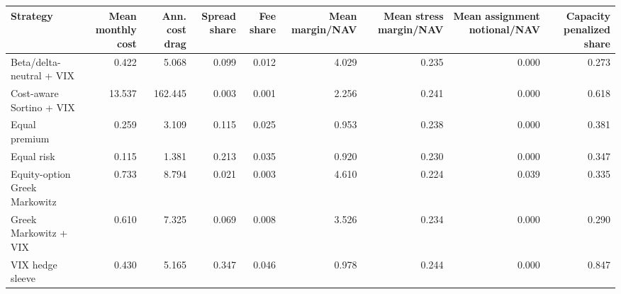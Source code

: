 \begin{tabular}{lrrrrrrrr}
\toprule
Strategy & Mean monthly cost & Ann. cost drag & Spread share & Fee share & Mean margin/NAV & Mean stress margin/NAV & Mean assignment notional/NAV & Capacity penalized share \\
\midrule
Beta/delta-neutral + VIX & 0.422 & 5.068 & 0.099 & 0.012 & 4.029 & 0.235 & 0.000 & 0.273 \\
Cost-aware Sortino + VIX & 13.537 & 162.445 & 0.003 & 0.001 & 2.256 & 0.241 & 0.000 & 0.618 \\
Equal premium & 0.259 & 3.109 & 0.115 & 0.025 & 0.953 & 0.238 & 0.000 & 0.381 \\
Equal risk & 0.115 & 1.381 & 0.213 & 0.035 & 0.920 & 0.230 & 0.000 & 0.347 \\
Equity-option Greek Markowitz & 0.733 & 8.794 & 0.021 & 0.003 & 4.610 & 0.224 & 0.039 & 0.335 \\
Greek Markowitz + VIX & 0.610 & 7.325 & 0.069 & 0.008 & 3.526 & 0.234 & 0.000 & 0.290 \\
VIX hedge sleeve & 0.430 & 5.165 & 0.347 & 0.046 & 0.978 & 0.244 & 0.000 & 0.847 \\
\bottomrule
\end{tabular}
